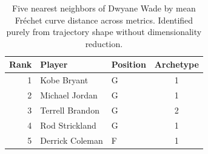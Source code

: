 \begin{table}[htbp]
  \centering\small
  \begin{tabular}{rllc}
    \toprule
    Rank & Player & Position & Archetype \\
    \midrule
    1 & Kobe Bryant & G & 1 \\
    2 & Michael Jordan & G & 1 \\
    3 & Terrell Brandon & G & 2 \\
    4 & Rod Strickland & G & 1 \\
    5 & Derrick Coleman & F & 1 \\
    \bottomrule
  \end{tabular}
  \caption{Five nearest neighbors of Dwyane Wade by mean Fr\'{e}chet curve distance across metrics. Identified purely from trajectory shape without dimensionality reduction.}
  \label{tab:Dwyane_Wade_frechet_curve_neighbors}
\end{table}

